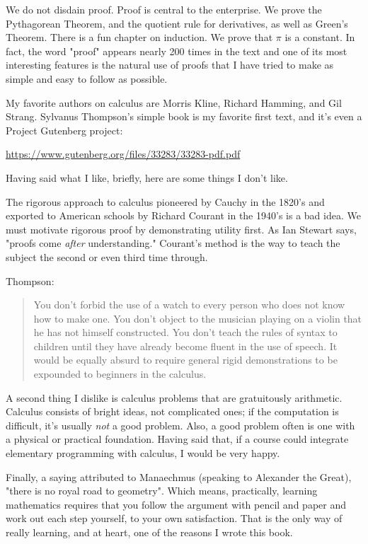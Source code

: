 \documentclass[11pt, oneside]{article}
\begin{document}
We do not disdain proof.  Proof is central to the enterprise.  We prove the Pythagorean Theorem, and the quotient rule for derivatives, as well as Green's Theorem.  There is a fun chapter on induction.  We prove that $\pi$ is a constant.  In fact, the word "proof" appears nearly 200 times in the text and one of its most interesting features is the natural use of proofs that I have tried to make as simple and easy to follow as possible.

My favorite authors on calculus are Morris Kline, Richard Hamming, and Gil Strang.  Sylvanus Thompson's simple book is my favorite first text, and it's even a Project Gutenberg project:

\url{https://www.gutenberg.org/files/33283/33283-pdf.pdf}

Having said what I like, briefly, here are some things I don't like.

The rigorous approach to calculus pioneered by Cauchy in the 1820's and exported to American schools by Richard Courant in the 1940's is a bad idea.  We must motivate rigorous proof by demonstrating utility first.  As Ian Stewart says, "proofs come \emph{after} understanding."  Courant's method is the way to teach the subject the second or even third time through.

Thompson:

\begin{quote}
You don't forbid the use of a watch to every person who does not know how to make one. You don't object to the musician playing on a violin that he has not himself constructed. You don't teach the rules of syntax to children until they have already become fluent in the use of speech. It would be equally absurd to require general rigid demonstrations to be expounded to beginners in the calculus.\end{quote}

A second thing I dislike is calculus problems that are gratuitously arithmetic.  Calculus consists of bright ideas, not complicated ones;  if the computation is difficult, it's usually \emph{not} a good problem.  Also, a good problem often is one with a physical or practical foundation.  Having said that, if a course could integrate elementary programming with calculus, I would be very happy.

Finally, a saying attributed to Manaechmus (speaking to Alexander the Great), "there is no royal road to geometry".  Which means, practically, learning mathematics requires that you follow the argument with pencil and paper and work out each step yourself, to your own satisfaction.  That is the only way of really learning, and at heart, one of the reasons I wrote this book.
\end{document}
